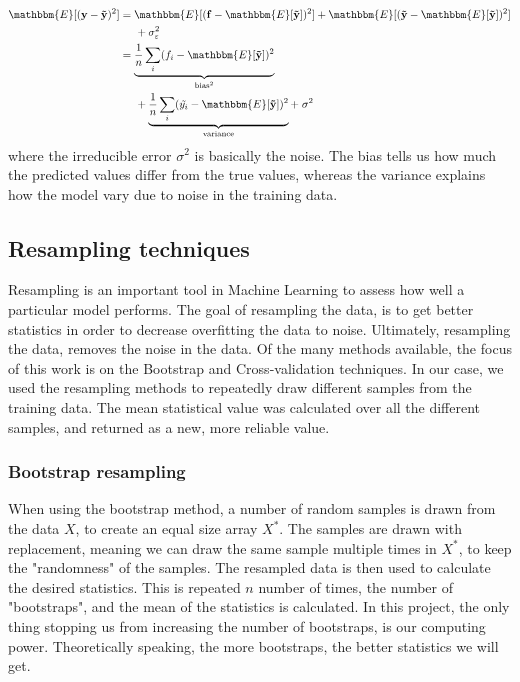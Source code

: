 \documentclass[norsk,a4paper,12pt]{article}
\begin{document}
\begin{multicols}{2}
\begin{equation*}
\begin{split}
    \mathbbm{E}[(\mathbf{y} - \mathbf{\tilde{y}})^2] & = \mathbbm{E}[(\mathbf{f} - \mathbbm{E}[\mathbf{\tilde{y}}])^2] + \mathbbm{E}[(\mathbf{\tilde{y}} - \mathbbm{E}[\mathbf{\tilde{y}}])^2] \\
    & \hspace{0.5cm} + \sigma_{\varepsilon}^2 \\
    & = \underbrace{\frac{1}{n} \sum_i (f_i - \mathbbm{E}[\mathbf{\tilde{y}}])^2}_{\mathrm{bias}^2} \\
    & \hspace{0.5cm} + \underbrace{\frac{1}{n} \sum_i (\tilde{y_i} - \mathbbm{E}[\mathbf{\tilde{y}}])^2}_{\mathrm{variance}} + \hspace{0.1cm} \sigma^2
\end{split}
\end{equation*}
where the irreducible error $\sigma^2$ is basically the noise. The bias tells us how much the predicted values differ from the true values, whereas the variance explains how the model vary due to noise in the training data.


\subsection{Resampling techniques}
Resampling is an important tool in Machine Learning to assess how well a particular model performs. The goal of resampling the data, is to get better statistics in order to decrease  overfitting the data to noise. Ultimately, resampling the data, removes the noise in the data. Of the many methods available, the focus of this work is on the Bootstrap and Cross-validation techniques. In our case, we used the resampling methods to repeatedly draw different samples from the training data. The mean statistical value was calculated over all the different samples, and returned as a new, more reliable value.

\subsubsection{Bootstrap resampling}
When using the bootstrap method, a number of random samples is drawn from the data $X$, to create an equal size array $X^*$. The samples are drawn with replacement, meaning we can draw the same sample multiple times in $X^*$, to keep the "randomness" of the samples. The resampled data is then used to calculate the desired statistics. This is repeated $n$ number of times, the number of "bootstraps", and the mean of the statistics is calculated. In this project, the only thing
stopping us from increasing the number of bootstraps, is our computing power. Theoretically speaking, the more bootstraps, the better statistics we will get.


\end{multicols}
\end{document}

